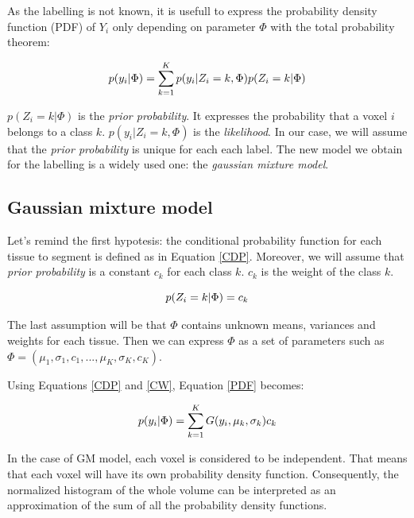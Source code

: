 \par
As the labelling is not known, it is usefull to express the probability density function (PDF) of $Y_i$ only depending on parameter $\Phi$ with the total probability theorem:

  \begin{equation}\label{PDF}
  p(y_i|\Phi)=\sum_{k=1}^K p(y_i|Z_i=k,\Phi)p(Z_i=k|\Phi)\\
  \end{equation}

\par
$p(Z_i=k|\Phi)$ is the \textit{prior probability}. It expresses the probability that a voxel $i$ belongs to a class $k$. $p(y_i|Z_i=k,\Phi)$ is the \textit{likelihood}. In our case, we will assume that the \textit{prior probability} is unique for each each label. The new model we obtain for the labelling is a widely used one: the \textit{gaussian mixture model}.
%
\subsection{Gaussian mixture model}
Let's remind the first hypotesis: the conditional probability function for each tissue to segment is defined as in Equation \ref{CDP}. Moreover, we will assume that \textit{prior probability} is a constant $c_k$ for each class $k$. $c_k$ is the weight of the class $k$.
  
  \begin{equation}\label{CW}
  p(Z_i=k|\Phi)=c_k\\
  \end{equation}

The last assumption will be that $\Phi$ contains unknown means, variances and weights for each tissue. Then we can express $\Phi$ as a set of parameters such as $\Phi=(\mu_1, \sigma_1, c_1, ..., \mu_K, \sigma_K, c_K)$. %
\par
Using Equations \ref{CDP} and \ref{CW}, Equation \ref{PDF} becomes:
 
  \begin{equation}\label{GMM}
  p(y_i|\Phi)=\sum_{k=1}^K G(y_i,\mu_k,\sigma_k)c_k\\
  \end{equation}

\par
In the case of GM model, each voxel is considered to be independent. That means that each voxel will have its own probability density function. Consequently, the normalized histogram of the whole volume can be interpreted as an approximation of the sum of all the probability density functions. %
%
